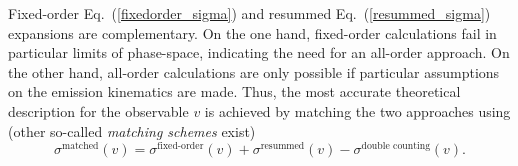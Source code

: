 Fixed-order Eq.~(\ref{fixedorder_sigma}) and resummed Eq.~(\ref{resummed_sigma}) expansions are complementary.
On the one hand, fixed-order calculations fail in particular limits of
phase-space, indicating the need for an all-order approach. On the
other hand, all-order calculations are only possible if particular
assumptions on the emission kinematics are made. Thus, the most
accurate theoretical description for the observable $v$ is
achieved by matching the two approaches \eg using (other so-called
{\em matching schemes} exist)
\begin{equation}\label{eq:matching-add}
\sigma^\text{matched}(v)=\sigma^\text{fixed-order}(v)+\sigma^\text{resummed}(v)-\sigma^\text{double counting}(v).
\end{equation}









